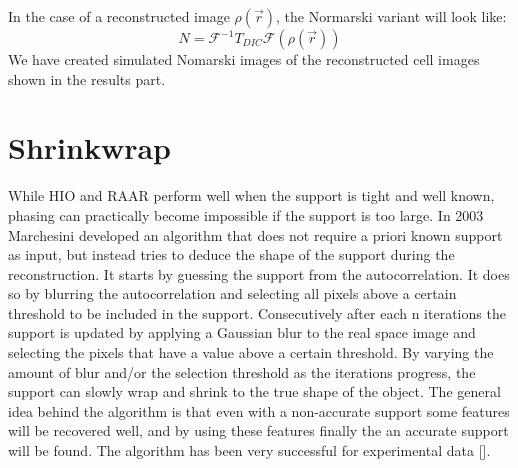 In the case of a reconstructed image $\rho(\vec{r})$, the Normarski variant will look like:
\begin{equation}
N = \mathcal{F}^{-1} T_{DIC} \mathcal{F}(\rho(\vec{r}))
\end{equation}
We have created simulated Nomarski images of the reconstructed cell images shown in the results part.

\section{Shrinkwrap}
While HIO and RAAR perform well when the support is tight and well known, phasing can practically become impossible if the support is too large. In 2003 Marchesini developed an algorithm that does not require a priori known support as input, but instead tries to deduce the shape of the support during the reconstruction. It starts by guessing the support from the autocorrelation. It does so by blurring the autocorrelation and selecting all pixels above a certain threshold to be included in the support. Consecutively after each n iterations the support is updated by applying a Gaussian blur to the real space image and selecting the pixels that have a value above a certain threshold. By varying the amount of blur and/or the selection threshold as the iterations progress, the support can slowly wrap and shrink to the true shape of the object. The general idea behind the algorithm is that even with a non-accurate support some features will be recovered well, and by using these features finally the an accurate support will be found. The algorithm has been very successful for experimental data [].

